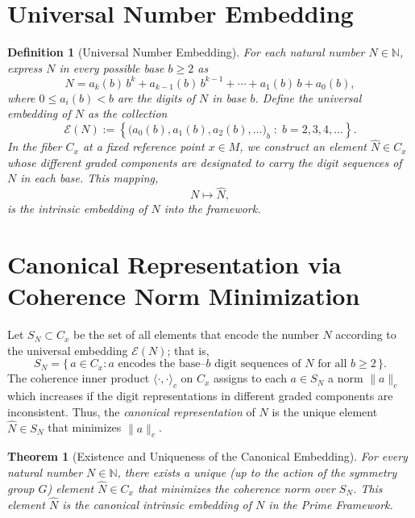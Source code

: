 \documentclass[12pt]{article}
\newtheorem{theorem}{Theorem}[section]
\newtheorem{definition}{Definition}[section]
\begin{document}
\section{Universal Number Embedding}
\begin{definition}[Universal Number Embedding]
For each natural number \(N \in \mathbb{N}\), express \(N\) in every possible base \(b \ge 2\) as
\[
N = a_k(b)\,b^k + a_{k-1}(b)\,b^{k-1} + \cdots + a_1(b)\,b + a_0(b),
\]
where \(0 \le a_i(b) < b\) are the digits of \(N\) in base \(b\). Define the universal embedding of \(N\) as the collection
\[
\mathcal{E}(N) := \left\{ \big(a_0(b), a_1(b), a_2(b), \dots \big)_b \;:\; b=2,3,4,\dots \right\}.
\]
In the fiber \(C_x\) at a fixed reference point \(x\in M\), we construct an element \(\hat{N} \in C_x\) whose different graded components are designated to carry the digit sequences of \(N\) in each base. This mapping,
\[
N \mapsto \hat{N},
\]
is the intrinsic embedding of \(N\) into the framework.
\end{definition}

\section{Canonical Representation via Coherence Norm Minimization}
Let \(S_N \subset C_x\) be the set of all elements that encode the number \(N\) according to the universal embedding \(\mathcal{E}(N)\); that is,
\[
S_N = \{\, a \in C_x : a \text{ encodes the base--\(b\) digit sequences of } N \text{ for all } b\ge2 \,\}.
\]
The coherence inner product \(\langle\cdot,\cdot\rangle_c\) on \(C_x\) assigns to each \(a\in S_N\) a norm \(\|a\|_c\) which increases if the digit representations in different graded components are inconsistent. Thus, the \emph{canonical representation} of \(N\) is the unique element \(\hat{N}\in S_N\) that minimizes \(\|a\|_c\).

\begin{theorem}[Existence and Uniqueness of the Canonical Embedding]
For every natural number \(N\in\mathbb{N}\), there exists a unique (up to the action of the symmetry group \(G\)) element \(\hat{N} \in C_x\) that minimizes the coherence norm over \(S_N\). This element \(\hat{N}\) is the canonical intrinsic embedding of \(N\) in the Prime Framework.
\end{theorem}
\end{document}
